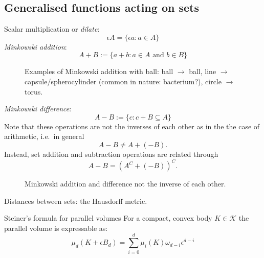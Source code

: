 \subsection{Generalised functions acting on sets}

Scalar multiplication or \emph{dilate}:
\begin{equation}
  \epsilon A = \{\epsilon a : a \in A\}
\end{equation}
\emph{Minkowski addition}:
\begin{equation}
  A + B := \{ a + b : a \in A \textrm{ and } b \in B \}
\end{equation}
\begin{SCfigure}[H]
  \missingfigure[figwidth=0.333\linewidth]{}%
  \missingfigure[figwidth=0.333\linewidth]{}%
  \missingfigure[figwidth=0.333\linewidth]{}
  \caption{Examples of Minkowski addition with ball:
    ball $\to$ ball,
    line $\to$ capsule/spherocylinder (common in nature: bacterium?),
    circle $\to$ torus.
  }
\end{SCfigure}
\emph{Minkowski difference}:
\begin{equation}
  A - B := \{ c : c + B \subseteq A \}
\end{equation}
Note that these operations are not the inverses of each other as in the the case of arithmetic, i.e.\ in general
\begin{equation*}
  A - B \ne A + (-B).
\end{equation*}
Instead, set addition and subtraction operations are related through
\begin{equation*}
  A - B = (A^C + (-B))^C.
\end{equation*}

\begin{SCfigure}[H]
  \caption{Minkowski addition and difference not the inverse of each other.}
\end{SCfigure}

Distances between sets: the Hausdorff metric.

\begin{theorem}{Steiner's formula for parallel volumes}
  For a compact, convex body $K \in \mathcal{K}$ the parallel volume is expressable as:
  \begin{equation}
    \mu_d(K + \epsilon B_d) =
    \sum_{i=0}^d \mu_i(K) \omega_{d-i} \epsilon^{d-i}
  \end{equation}
\end{theorem}

